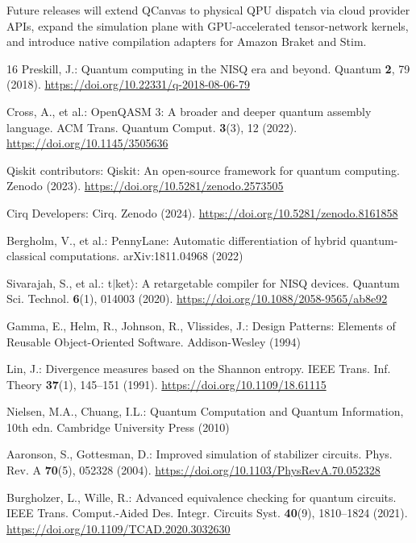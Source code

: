 \documentclass[runningheads]{llncs}
\begin{document}
Future releases will extend QCanvas to physical QPU dispatch via cloud provider APIs, expand the simulation plane with GPU-accelerated tensor-network kernels, and introduce native compilation adapters for Amazon Braket and Stim.


\begin{thebibliography}{16}
Preskill, J.: Quantum computing in the NISQ era and beyond.
Quantum \textbf{2}, 79 (2018).
\url{https://doi.org/10.22331/q-2018-08-06-79}

Cross, A., et al.: OpenQASM 3: A broader and deeper quantum assembly language.
ACM Trans. Quantum Comput. \textbf{3}(3), 12 (2022).
\url{https://doi.org/10.1145/3505636}

Qiskit contributors: Qiskit: An open-source framework for quantum computing.
Zenodo (2023).
\url{https://doi.org/10.5281/zenodo.2573505}

Cirq Developers: Cirq. Zenodo (2024).
\url{https://doi.org/10.5281/zenodo.8161858}

Bergholm, V., et al.: PennyLane: Automatic differentiation of hybrid quantum-classical computations.
arXiv:1811.04968 (2022)

Sivarajah, S., et al.: t$|$ket$\rangle$: A retargetable compiler for NISQ devices.
Quantum Sci. Technol. \textbf{6}(1), 014003 (2020).
\url{https://doi.org/10.1088/2058-9565/ab8e92}

Gamma, E., Helm, R., Johnson, R., Vlissides, J.: Design Patterns: Elements of Reusable Object-Oriented Software.
Addison-Wesley (1994)

Lin, J.: Divergence measures based on the Shannon entropy.
IEEE Trans. Inf. Theory \textbf{37}(1), 145--151 (1991).
\url{https://doi.org/10.1109/18.61115}

Nielsen, M.A., Chuang, I.L.: Quantum Computation and Quantum Information, 10th edn.
Cambridge University Press (2010)

Aaronson, S., Gottesman, D.: Improved simulation of stabilizer circuits.
Phys. Rev. A \textbf{70}(5), 052328 (2004).
\url{https://doi.org/10.1103/PhysRevA.70.052328}

Burgholzer, L., Wille, R.: Advanced equivalence checking for quantum circuits.
IEEE Trans. Comput.-Aided Des. Integr. Circuits Syst. \textbf{40}(9), 1810--1824 (2021).
\url{https://doi.org/10.1109/TCAD.2020.3032630}


\end{thebibliography}
\end{document}

